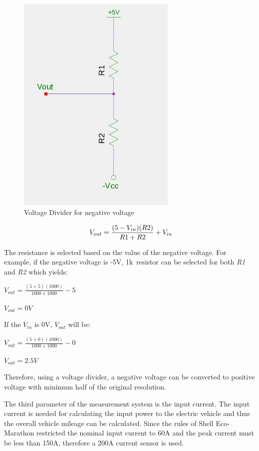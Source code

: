 \begin{figure}[htb]
	\centering
	\includegraphics[width=3in]{images/voltage_divider_negative.jpg}
	\caption{Voltage Divider for negative voltage}
	\label{im:voltageDividerInverse}
\end{figure}

\begin{equation}
	\label{eq:voltageDividerInverse}
	\text{\myequations{Voltage Divider for negative voltage}}
	V_{out} = \frac{(5-V_{in})(R2)}{R1+R2} + V_{in}
\end{equation}

The resistance is selected based on the value of the negative voltage. For example, if the negative voltage is -5V, 1k\ohm \ resistor can be selected for both \textit{R1} and \textit{R2} which yields:

\centerline{$V_{out} = \frac{(5+5)(1000)}{1000+1000} - 5$}
\centerline{$V_{out} = 0V$}


If the \textit{$V_{in}$} is 0V, \textit{$V_{out}$} will be:

\centerline{$V_{out} = \frac{(5+0)(1000)}{1000+1000} - 0$}
\centerline{$V_{out} = 2.5V$}

Therefore, using a voltage divider, a negative voltage can be converted to positive voltage with minimum half of the original resolution.

The third parameter of the measurement system is the input current. The input current is needed for calculating the input power to the electric vehicle and thus the overall vehicle mileage can be calculated. Since the rules of Shell Eco-Marathon restricted the nominal input current to 60A and the peak current must be less than 150A, therefore a 200A current sensor is used.

